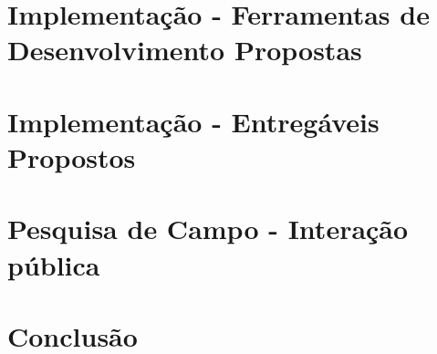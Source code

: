 \documentclass{article}
\begin{document}
	\section{Implementação - Ferramentas de Desenvolvimento Propostas} \label{if}
	\paragraph{}
	
	\section{Implementação - Entregáveis Propostos} \label{ie}
	\paragraph{}
	
	\section{Pesquisa de Campo - Interação pública} \label{pc}
	\paragraph{}

	\section{Conclusão} \label{c}
	\paragraph{}
		
	
	
\end{document}
